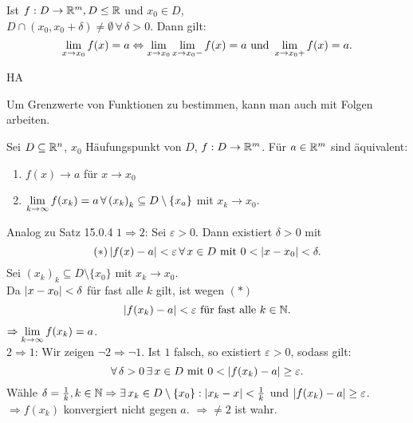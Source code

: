 \documentclass[../ana1.tex]{subfiles}
\begin{document}
\begin{bem}
    Ist \( f: D \rightarrow \mathbb{R}^m, D \leq \mathbb{R} \) und \( x_0 \in D \),\\
    \( D \cap (x_0, x_0 + \delta) \neq \emptyset \,\forall \, 
    \delta > 0 \). Dann gilt: 
    \[ \lim\limits_{x\rightarrow x_0} f(x) = a \Leftrightarrow \lim\limits_{x\rightarrow x_0} 
    \lim\limits_{x\rightarrow x_0-} f(x) = a \text{ und } \lim\limits_{x\rightarrow x_0+} 
    f(x) = a. \]
\end{bem}
\begin{bew}
    HA
\end{bew}
Um Grenzwerte von Funktionen zu bestimmen, kann man auch 
mit Folgen arbeiten.
\begin{satz}
    Sei \( D \subseteq \mathbb{R}^n \), \(x_0 \) Häufungspunkt von 
    \( D \), \( f: D \rightarrow \mathbb{R}^m \). Für \( a\in \mathbb{R}^m \) 
    sind äquivalent:
    \begin{enumerate}
        \item \( f(x) \rightarrow a \) für \( x\rightarrow x_0 \)
        \item \( \lim\limits_{k\rightarrow\infty} f(x_k) = a \,\forall \, {(x_k)}_k 
        \subseteq D \setminus \{x_a\} \) mit \( x_k \rightarrow x_0 \).
    \end{enumerate}
\end{satz}
\begin{bew}
    Analog zu Satz 15.0.4
    \( 1 \Rightarrow 2 \): Sei \( \varepsilon > 0 \). Dann 
    existiert \( \delta > 0 \) mit 
    \[ (*) \left|f(x) - a\right| < \varepsilon \,\forall \, x\in D 
    \text{ mit } 0 < \left|x-x_0\right| < \delta. \]
    Sei \( {(x_k)}_k \subseteq D \setminus \{x_0\} \) mit 
    \( x_k \rightarrow x_0 \).\\
    Da \( \left|x-x_0\right| < \delta \) für fast alle \(k\) gilt, 
    ist wegen \( (*) \)
    \[ \left|f(x_k) - a\right| < \varepsilon \text{ für fast alle } k\in\mathbb{N}. \]
    \( \Rightarrow \lim\limits_{k\rightarrow\infty} f(x_k) = a \).\\
    \( 2 \Rightarrow 1\): Wir zeigen 
    \( \neg 2 \Rightarrow \neg 1\).
    Ist \( 1 \) falsch, so existiert \( \varepsilon > 0 \), sodass
    gilt: 
    \[ \forall \, \delta > 0 \,\exists \, x \in D \text{ mit } 0 < 
    \left|f(x_k) - a\right| \geq \varepsilon. \]
    Wähle \( \delta = \frac{1}{k}, k\in\mathbb{N} \Rightarrow \exists \, x_k 
    \in D\setminus \{ x_0 \} : \left|x_k - x\right| < \frac{1}{k} \) und 
    \( \left|f(x_k) - a\right| \geq \varepsilon \).\\
    \( \Rightarrow f(x_k) \) konvergiert nicht gegen \(a\). 
    \( \Rightarrow \neq 2 \) ist wahr.
\end{bew}
\end{document}
